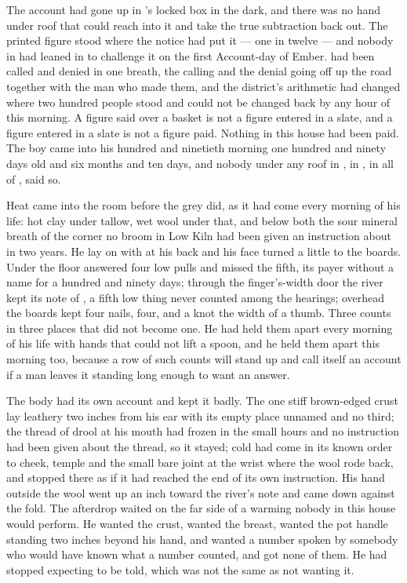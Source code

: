 
The account had gone up  in 's locked box in the dark, and there was no hand under  roof that could reach into it and take the true subtraction back out. The printed figure stood where the notice had put it --- one in twelve --- and nobody in  had leaned in to challenge it on the first Account-day of Ember.  had been called and denied in one breath, the calling and the denial going off up the road together with the man who made them, and the district's arithmetic had changed where two hundred people stood and could not be changed back by any hour of this morning. A figure said over a basket is not a figure entered in a slate, and a figure entered in a slate is not a figure paid. Nothing in this house had been paid. The boy came into his hundred and ninetieth morning one hundred and ninety days old and six months and ten days, and nobody under any roof in , in , in all of , said so.

Heat came into the room before the grey did, as it had come every morning of his life: hot clay under tallow, wet wool under that, and below both the sour mineral breath of the corner no broom in Low Kiln had been given an instruction about in two years. He lay on  with  at his back and his face turned a little to the boards. Under the floor  answered four low pulls and missed the fifth, its payer without a name for a hundred and ninety days; through the finger's-width door the river kept its note of , a fifth low thing never counted among the hearings; overhead the boards kept four nails, four, and a knot the width of a thumb. Three counts in three places that did not become one. He had held them apart every morning of his life with hands that could not lift a spoon, and he held them apart this morning too, because a row of such counts will stand up and call itself an account if a man leaves it standing long enough to want an answer.

The body had its own account and kept it badly. The one stiff brown-edged crust lay leathery two inches from his ear with its empty place unnamed and no third; the thread of drool at his mouth had frozen in the small hours and no instruction had been given about the thread, so it stayed; cold had come in its known order to cheek, temple and the small bare joint at the wrist where the wool rode back, and stopped there as if it had reached the end of its own instruction. His hand outside the wool went up an inch toward the river's note and came down against the fold. The afterdrop waited on the far side of a warming nobody in this house would perform. He wanted the crust, wanted the breast, wanted the pot handle standing two inches beyond his hand, and wanted a number spoken by somebody who would have known what a number counted, and got none of them. He had stopped expecting to be told, which was not the same as not wanting it.


